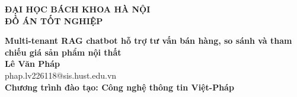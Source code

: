 \documentclass[DoAn.tex]{subfiles}
\begin{document}
\begin{titlepage}
\thispagestyle{empty}
\begin{center}

{\textbf{\large{ĐẠI HỌC BÁCH KHOA HÀ NỘI}}}\\[4cm]

{\textbf{\huge{ ĐỒ ÁN TỐT NGHIỆP}}}\\[1cm]
{\textbf{\Large{Multi-tenant RAG chatbot hỗ trợ tư vấn bán hàng, so sánh và tham chiếu giá sản phẩm nội thất}}\\[1cm]

{\textbf{\large{Lê Văn Pháp}}}\\
{\large{phap.lv226118@sis.hust.edu.vn}}\\[0.5cm]

{\textbf{\large{Chương trình đào tạo: Công nghệ thông tin Việt-Pháp
}}}\\

\vspace{4cm}
\begin{table}[H]
\centering
{}
\end{table}}
\end{center}



\end{titlepage}
\end{document}
